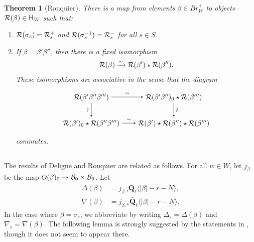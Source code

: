 \documentclass[a4paper,10pt,leqno]{amsart}
\theoremstyle{plain}
\theoremstyle{plain}
\newtheorem{thm}{Theorem}[subsection]
\theoremstyle{plain}
\theoremstyle{definition}
\theoremstyle{remark}
\newcommand{\Br}{\mathit{Br}}
\newcommand{\QL}{\bar{\mathbf{Q}}_\ell}
\begin{document}
\begin{thm}[Rouquier]\label{thm:rouquier}
There is a map from elements $\beta \in \Br_W^+$ to objects $\cal{R}(\beta) \in \sf{H}_W$ such that:
\begin{enumerate}
\item 	$\cal{R}(\sigma_s) = \cal{R}_s^+$ and $\cal{R}(\sigma_s^{-1}) = \cal{R}_s^-$ for all $s \in S$.
\item 	If $\beta = \beta' \beta''$, then there is a fixed isomorphism
		\begin{align}
		\cal{R}(\beta) \xrightarrow{\sim} \cal{R}(\beta') \star \cal{R}(\beta'').
		\end{align}
		These isomorphisms are associative in the sense that the diagram
		\begin{equation}
\begin{tikzpicture}[baseline=(current bounding box.center), >=stealth]
\matrix(m)[matrix of math nodes, row sep=2em, column sep=2em, text height=2ex, text depth=0.5ex]
{	\cal{R}(\beta'\beta''\beta''')
		&\cal{R}(\beta'\beta'')_0 \star \cal{R}(\beta''')\\
	\cal{R}(\beta')_0 \star \cal{R}(\beta''\beta''')
		&\cal{R}(\beta') \star \cal{R}(\beta'') \star \cal{R}(\beta''')\\
		};
\path[->,font=\scriptsize, auto]
(m-1-1) 	edge node{$\sim$} (m-1-2)
			edge node[rotate=90,above]{$\sim$} (m-2-1)
(m-1-2) 	edge node[rotate=90,below]{$\sim$} (m-2-2)
(m-2-1) 	edge node{$\sim$} (m-2-2);
\end{tikzpicture}
\end{equation}
commutes.
\end{enumerate}
\end{thm}


\subsection{}

The results of Deligne and Rouquier are related as follows.
For all $w \in W$, let $j_\beta$ be the map $O(\beta)_0 \to \cal{B}_0 \times \cal{B}_0$.
Let
\begin{align}
\Delta(\beta) &= j_{\beta, !} \QL\langle |\beta| - r - N\rangle,\\
\nabla(\beta) &= j_{\beta, \ast} \QL\langle |\beta| - r - N\rangle.
\end{align}
In the case where $\beta = \sigma_s$, we abbreviate by writing $\Delta_s = \Delta(\beta)$ and $\nabla_s = \nabla(\beta)$.
The following lemma is strongly suggested by the statements in \cite[\S{11}]{rouquier_2006}, though it does not seem to appear there.
\end{document}
